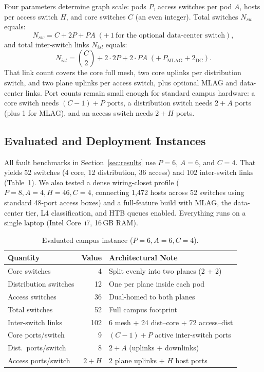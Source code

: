 \documentclass[conference]{IEEEtran}
\begin{document}
Four parameters determine graph scale: pods $P$, access switches per pod $A$, hosts per access switch $H$, and core switches $C$ (an even integer). Total switches $N_{sw}$ equals:
\[
N_{sw} = C + 2P + PA \;(+\,1\ \text{for the optional data-center switch}),
\]
and total inter-switch links $N_{isl}$ equals:
\[
N_{isl} = \binom{C}{2} + 2\cdot 2P + 2\cdot PA \;(+\,P_{\text{MLAG}} + 2_{\text{DC}}).
\]
That link count covers the core full mesh, two core uplinks per distribution switch, and two plane uplinks per access switch, plus optional MLAG and data-center links. Port counts remain small enough for standard campus hardware: a core switch needs $(C{-}1)+P$ ports, a distribution switch needs $2+A$ ports (plus 1 for MLAG), and an access switch needs $2+H$ ports.

\subsection{Evaluated and Deployment Instances}
All fault benchmarks in Section~\ref{sec:results} use $P{=}6$, $A{=}6$, and $C{=}4$. That yields 52 switches (4 core, 12 distribution, 36 access) and 102 inter-switch links (Table~\ref{tab:scale}). We also tested a dense wiring-closet profile ($P{=}8, A{=}4, H{=}46, C{=}4$, connecting 1{,}472 hosts across 52 switches using standard 48-port access boxes) and a full-feature build with MLAG, the data-center tier, L4 classification, and HTB queues enabled. Everything runs on a single laptop (Intel Core~i7, 16\,GB RAM).

\begin{table}[t]
\caption{Evaluated campus instance ($P{=}6, A{=}6, C{=}4$).}
\label{tab:scale}
\centering
\begin{tabular}{@{}lrl@{}}
\toprule
Quantity & Value & Architectural Note \\
\midrule
Core switches        & 4   & Split evenly into two planes (2 + 2) \\
Distribution switches& 12  & One per plane inside each pod \\
Access switches      & 36  & Dual-homed to both planes \\
Total switches       & 52  & Full campus footprint \\
Inter-switch links   & 102 & 6 mesh + 24 dist--core + 72 access--dist \\
Core ports/switch    & 9   & $(C{-}1)+P$ active inter-switch ports \\
Dist.\ ports/switch  & 8   & $2+A$ (uplinks + downlinks) \\
Access ports/switch  & $2{+}H$ & 2 plane uplinks + $H$ host ports \\
\bottomrule
\end{tabular}
\end{table}
\end{document}

